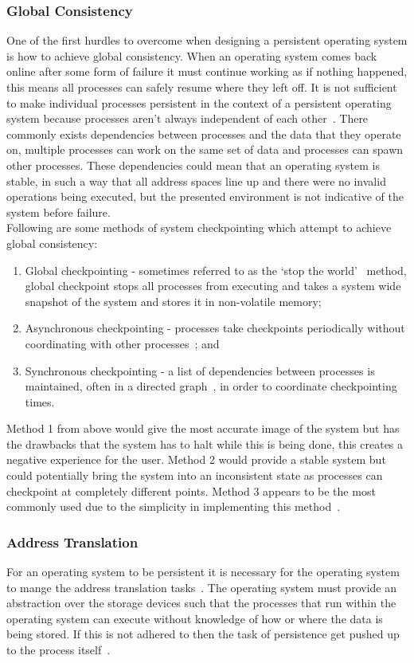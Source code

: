 \documentclass[a4paper,12pt]{article}
\begin{document}
\subsubsection{Global Consistency}
One of the first hurdles to overcome when designing a persistent operating system is how to achieve global consistency. When an operating system comes back online after some form of failure it must continue working as if nothing happened, this means all processes can safely resume where they left off. 
It is not sufficient to make individual processes persistent in the context of a persistent operating system because processes aren't always independent of each other~\citep{coexistence}. There commonly exists dependencies between processes and the data that they operate on, multiple processes can work on the same set of data and processes can spawn other processes. These dependencies could mean that an operating system is stable, in such a way that all address spaces line up and there were no invalid operations being executed, but the presented environment is not indicative of the system before failure.
\\
Following are some methods of system checkpointing which attempt to achieve global consistency:
\begin{enumerate}
    \item{Global checkpointing - sometimes referred to as the `stop the world'~\citep{grasshopperkernel} method, global checkpoint stops all processes from executing and takes a system wide snapshot of the system and stores it in non-volatile memory;}
    \item{Asynchronous checkpointing - processes take checkpoints periodically without coordinating with other processes~\citep{checkpointing}; and}
    \item{Synchronous checkpointing - a list of dependencies between processes is maintained, often in a directed graph~\citep{coexistence}, in order to coordinate checkpointing times.}
\end{enumerate}
Method 1 from above would give the most accurate image of the system but has the drawbacks that the system has to halt while this is being done, this creates a negative experience for the user. Method 2 would provide a stable system but could potentially bring the system into an inconsistent state as processes can checkpoint at completely different points. Method 3 appears to be the most commonly used due to the simplicity in implementing this method~\citep{checkpointing}.
\subsubsection{Address Translation}
For an operating system to be persistent it is necessary for the operating system to mange the address translation tasks~\citep{Dearle92anexamination}. The operating system must provide an abstraction over the storage devices such that the processes that run within the operating system can execute without knowledge of how or where the data is being stored. If this is not adhered to then the task of persistence get pushed up to the process itself~\citep{Kakkad:1998:ATS:899484}.
\end{document}
